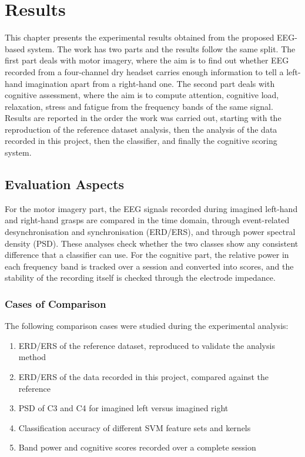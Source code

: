 \chapter{Results}

This chapter presents the experimental results obtained from the proposed EEG-based
system. The work has two parts and the results follow the same split. The first part deals
with motor imagery, where the aim is to find out whether EEG recorded from a four-channel
dry headset carries enough information to tell a left-hand imagination apart from a
right-hand one. The second part deals with cognitive assessment, where the aim is to
compute attention, cognitive load, relaxation, stress and fatigue from the frequency bands
of the same signal. Results are reported in the order the work was carried out, starting
with the reproduction of the reference dataset analysis, then the analysis of the data
recorded in this project, then the classifier, and finally the cognitive scoring system.

\section{Evaluation Aspects}

For the motor imagery part, the EEG signals recorded during imagined left-hand and
right-hand grasps are compared in the time domain, through event-related desynchronisation
and synchronisation (ERD/ERS), and through power spectral density (PSD). These analyses
check whether the two classes show any consistent difference that a classifier can use. For
the cognitive part, the relative power in each frequency band is tracked over a session and
converted into scores, and the stability of the recording itself is checked through the
electrode impedance.

\subsection{Cases of Comparison}

The following comparison cases were studied during the experimental analysis:

\begin{enumerate}
    \item ERD/ERS of the reference dataset, reproduced to validate the analysis method
    \item ERD/ERS of the data recorded in this project, compared against the reference
    \item PSD of C3 and C4 for imagined left versus imagined right
    \item Classification accuracy of different SVM feature sets and kernels
    \item Band power and cognitive scores recorded over a complete session
\end{enumerate}

